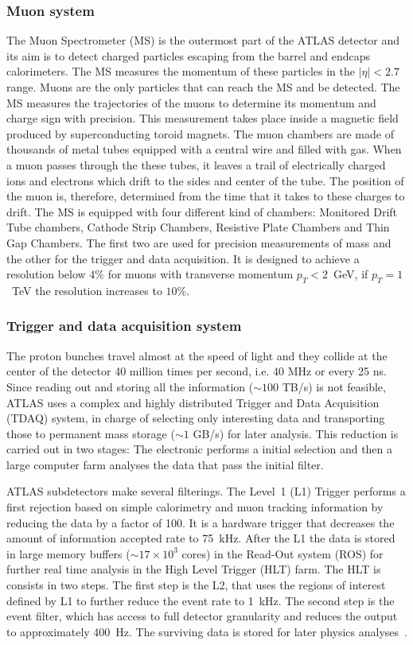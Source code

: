 \subsubsection*{Muon system}
The Muon Spectrometer (MS) is the outermost part of the ATLAS detector and its aim is to detect charged particles escaping from the barrel and endcaps calorimeters. The MS measures the momentum of these particles in the $|\eta|<2.7$ range. Muons are the only particles that can reach the MS and be detected. The MS measures the trajectories of the muons to determine its momentum and charge sign with precision. This measurement takes place inside a magnetic field produced by superconducting toroid magnets. The muon chambers are made of thousands of metal tubes equipped with a central wire and filled with gas. When a muon passes through the these tubes, it leaves a trail of electrically charged ions and electrons which drift to the sides and center of the tube. The position of the muon is, therefore, determined from the time that it takes to these charges to drift.
The MS is equipped with four different kind of chambers: Monitored Drift Tube chambers, Cathode Strip Chambers, Resistive Plate Chambers and Thin Gap Chambers. The first two are used for precision measurements of mass and the other for the trigger and data acquisition. It is designed to achieve a resolution below $4 \%$ for muons with transverse momentum $p_T < 2$~GeV, if $p_T = 1$~TeV the resolution increases to $10 \%$.

\subsubsection*{Trigger and data acquisition system} \label{subsec:trigg}
The proton bunches travel almost at the speed of light and they collide at the center of the detector 40 million times per second, i.e. 40 MHz or every 25 ns. Since reading out and storing all the information ($\sim 100$ TB/s) is not feasible, ATLAS uses a complex and highly distributed Trigger and Data Acquisition (TDAQ) system, in charge of selecting only interesting data and transporting those to permanent mass storage ($\sim 1$ GB/s) for later analysis. This reduction is carried out in two stages: The electronic performs a initial selection and then a large computer farm analyses the data that pass the initial filter.

ATLAS subdetectors make several filterings. The Level~1 (L1) Trigger performs a first rejection based on simple calorimetry and muon tracking information by reducing the data by a factor of 100. It is a hardware trigger that decreases the amount of information accepted rate to 75~kHz. After the L1 the data is stored in large memory buffers ($\sim 17 \times 10^{3}$ cores) in the Read-Out system (ROS) for further real time analysis in the High Level Trigger (HLT) farm. The HLT is consists in two steps. The first step is the L2, that uses the regions of interest defined by L1 to further reduce the event rate to 1~kHz. The second step is the event filter, which has access to full detector granularity and reduces the output to approximately 400~Hz. The surviving data is stored for later physics analyses~\cite{Astigarraga:2015caa}.

